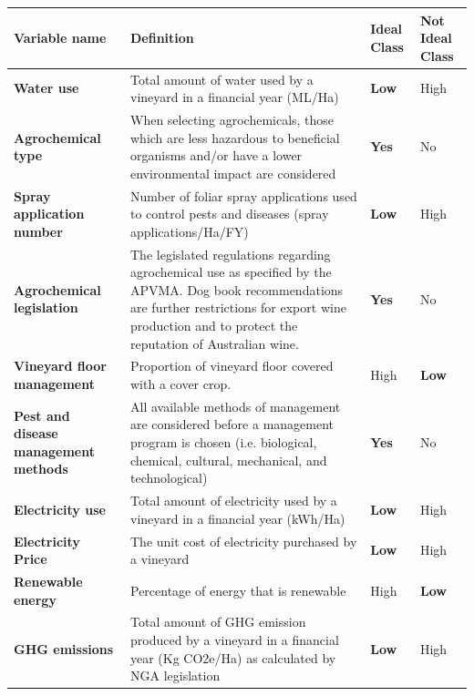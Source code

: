 % 
% 
\begin{table}[h]\label{tab:definitions} 
    \begin{tabular}{@{}llll@{}}
    \toprule
    \textbf{Variable name} & Definition & \textbf{Ideal Class} & Not Ideal Class \\ \midrule
    \textbf{Water use} & Total amount of water used by a vineyard in a financial year (ML/Ha) & \textbf{Low} & High \\
    \textbf{Agrochemical type} & When selecting agrochemicals, those which are less hazardous to beneficial organisms and/or have a lower environmental impact are considered & \textbf{Yes} & No \\
    \textbf{Spray application number} & Number of foliar spray applications used to control pests and diseases (spray applications/Ha/FY) & \textbf{Low} & High \\
    \textbf{Agrochemical legislation} & The legislated regulations regarding agrochemical use as specified by the APVMA. Dog book recommendations are further restrictions for export wine production and to protect the reputation of Australian wine. & \textbf{Yes} & No \\
    \textbf{Vineyard floor management} & Proportion of vineyard floor covered with a cover crop. & High & \textbf{Low} \\
    \textbf{Pest and disease management methods} & All available methods of management are considered before a management program is chosen (i.e. biological, chemical, cultural, mechanical, and technological) & \textbf{Yes} & No \\
    \textbf{Electricity use} & Total amount of electricity used by a vineyard in a financial year (kWh/Ha) & \textbf{Low} & High \\
    \textbf{Electricity Price} & The unit cost of electricity purchased by a vineyard & \textbf{Low} & High \\
    \textbf{Renewable energy} & Percentage of energy that is renewable & High & \textbf{Low} \\
    \textbf{GHG emissions} & Total amount of GHG emission produced by a vineyard in a financial year (Kg CO2e/Ha) as calculated  by NGA legislation & \textbf{Low} & High \\

\end{tabular}
\end{table}
